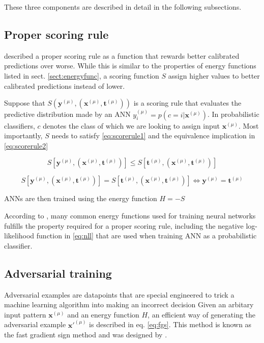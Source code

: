 These three components are described in detail in the following subsections.

\subsection{Proper scoring rule}

\cite{lakshminarayanan2017simple} described a proper scoring rule as a function that rewards better calibrated predictions over worse. While this is similar to the properties of energy functions listed in sect. \ref{sect:energyfunc}, a scoring function $S$ assign higher values to better calibrated predictions instead of lower. 

Suppose that $S(\bm{y}^{(\mu)},(\bm{x}^{(\mu)},\bm{t}^{(\mu)}))$ is a scoring rule that evaluates the predictive distribution made by an ANN $y_i^{(\mu)} = p\left(c = i|\bm{x}^{(\mu)}\right)$. In probabilistic classifiers, $c$ denotes the class of which we are looking to assign input $\bm{x}^{(\mu)}$. Most importantly, $S$ needs to satisfy \eqref{eq:scorerule1} and the equivalence implication in \eqref{eq:scorerule2}

\begin{equation}
    \label{eq:scorerule1}
    S[\bm{y}^{(\mu)},(\bm{x}^{(\mu)},\bm{t}^{(\mu)})] \leq S[\bm{t}^{(\mu)},(\bm{x}^{(\mu)},\bm{t}^{(\mu)})]
\end{equation}

\begin{equation}
    \label{eq:scorerule2}
    S[\bm{y}^{(\mu)},(\bm{x}^{(\mu)},\bm{t}^{(\mu)})] = S[\bm{t}^{(\mu)},(\bm{x}^{(\mu)},\bm{t}^{(\mu)})] \iff \bm{y}^{(\mu)} = \bm{t}^{(\mu)}
\end{equation}

ANNs are then trained using the energy function $H = -S$

According to \cite{lakshminarayanan2017simple}, many common energy functions used for training neural networks fulfills the property required for a proper scoring rule, including the negative log-likelihood function in \eqref{eq:nll} that are used when training ANN as a probabilistic classifier.

\subsection{Adversarial training}
\label{sect:adv}
Adversarial examples are datapoints that are special engineered to trick a machine learning algorithm into making an incorrect decision\cite{nguyen2015deep,lowd2005adversarial} Given an arbitary input pattern $\bm{x}^{(\mu)}$ and an energy function $H$, an efficient way of generating the adversarial example $\bm{x}'^{(\mu)}$ is described in eq. \eqref{eq:fgs}. This method is known as the fast gradient sign method and was designed by \cite{goodfellow2014generative}.

